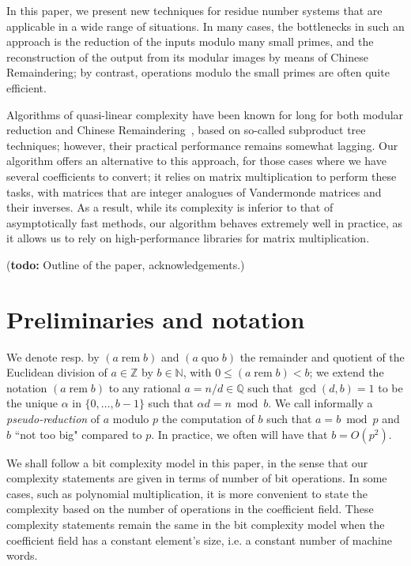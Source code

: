 \documentclass[acmtoms]{acmsmall}
\def\N{\mathbb{N}}
\def\Q{\mathbb{Q}}
\newcommand{\tmop}[1]{\ensuremath{\operatorname{#1}}}
\newcommand{\rem}{\tmop{rem}}
\newcommand{\quo}{\tmop{quo}}
\newcommand{\todo}[1]{(\textbf{todo:} #1)}
\begin{document}
In this paper, we present new techniques for residue number systems that are applicable in a wide
range of situations. In many cases, the bottlenecks in such an approach is the reduction of the
inputs modulo many small primes, and the reconstruction of the output from its modular images by
means of Chinese Remaindering; by contrast, operations modulo the small primes are often quite
efficient.

Algorithms of quasi-linear complexity have been known for long for both modular reduction and
Chinese Remaindering~\cite[Chapter~10]{GaGe13}, based on so-called subproduct tree techniques;
however, their practical performance remains somewhat lagging. Our algorithm offers an alternative
to this approach, for those cases where we have several coefficients to convert; it relies on
matrix multiplication to perform these tasks, with matrices that are integer analogues of
Vandermonde matrices and their inverses. As a result, while its complexity is inferior to that of
asymptotically fast methods, our algorithm behaves extremely well in practice, as it allows us to
rely on high-performance libraries for matrix multiplication.

\todo{Outline of the paper, acknowledgements.}


\section{Preliminaries and notation}

We denote resp. by $(a \rem b)$ and $(a \quo b)$ the remainder and quotient of the Euclidean
division of $a \in \mathbb{Z}$ by $b \in \N$, with $0 \leqslant (a \rem b) < b$; we extend the
notation $(a \rem b)$ to any rational $a=n/d \in \Q$ such that $\gcd (d,b) = 1$ to be the unique
$\alpha$ in $\{0,\dots,b-1\}$ such that $\alpha d = n \bmod b$. We call informally a {\em
  pseudo-reduction} of $a$ modulo $p$ the computation of $b$ such that $a = b \bmod p$ and $b$ ``not
too big" compared to $p$. In practice, we often will have that $b =O (p^2)$.


We shall follow a bit complexity model in this paper, in the sense that our complexity statements
are given in terms of number of bit operations. In some cases, such as polynomial multiplication, it
is more convenient to state the complexity based on the number of operations in the coefficient
field.  These complexity statements remain the same in the bit complexity model when the coefficient
field has a constant element's size, i.e. a constant number of machine words.
\end{document}
